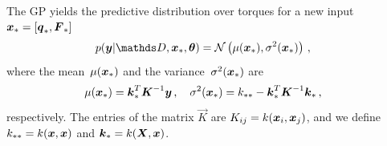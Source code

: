     The GP yields the predictive distribution over torques for a new input $\boldsymbol{x}_* = [\boldsymbol{q}_*, \boldsymbol F_*]$
	\begin{align}
		&\prob(\vec y|\dataset,\parameters_*,\vec \theta) = \gauss{\mu(\parameters_*)}{\sigma^2(\parameters_*)}\,, 
		\label{eq:one-step prediction distr}
	\end{align}
	where the mean~$\mu(\boldsymbol{x}_*)$ and the variance~$\sigma^2(\boldsymbol{x}_*)$ are 
	\begin{align}
		&\mu(\boldsymbol{x}_*) = \boldsymbol{k}^T_*\boldsymbol{K}^{-1} \boldsymbol y\,,\quad \sigma^2(\boldsymbol{x}_*) = k_{**}-\boldsymbol{k}^T_*\boldsymbol K^{-1}\boldsymbol{k}_*\,,
		\label{eq:one-step prediction mean and covariance}
	\end{align}
    respectively.	The entries of the matrix $\vec K$ are  $K_{ij}= k(\boldsymbol{x}_i,\boldsymbol{x}_j)$, and we define $k_{**}=k(\boldsymbol{x},\boldsymbol{x})$ and $\boldsymbol{k}_{*}=k(\boldsymbol{X},\boldsymbol{x})$.
    
